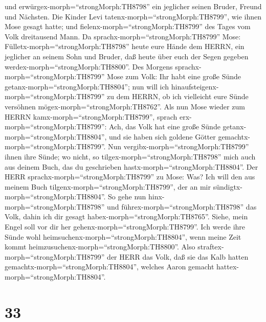 und erwürgex-morph=``strongMorph:TH8798'' ein jeglicher seinen Bruder,
Freund und Nächsten.  Die Kinder Levi
tatenx-morph=``strongMorph:TH8799'', wie ihnen Mose gesagt hatte; und
fielenx-morph=``strongMorph:TH8799'' des Tages vom Volk dreitausend
Mann.  Da sprachx-morph=``strongMorph:TH8799'' Mose:
Fülletx-morph=``strongMorph:TH8798'' heute eure Hände dem HERRN, ein
jeglicher an seinem Sohn und Bruder, daß heute über euch der Segen
gegeben werdex-morph=``strongMorph:TH8800''.  Des Morgens
sprachx-morph=``strongMorph:TH8799'' Mose zum Volk: Ihr habt eine große
Sünde getanx-morph=``strongMorph:TH8804''; nun will ich
hinaufsteigenx-morph=``strongMorph:TH8799'' zu dem HERRN, ob ich
vielleicht eure Sünde versöhnen mögex-morph=``strongMorph:TH8762''.
 Als nun Mose wieder zum HERRN
kamx-morph=``strongMorph:TH8799'', sprach
erx-morph=``strongMorph:TH8799'': Ach, das Volk hat eine große Sünde
getanx-morph=``strongMorph:TH8804'', und sie haben sich goldene Götter
gemachtx-morph=``strongMorph:TH8799''.  Nun
vergibx-morph=``strongMorph:TH8799'' ihnen ihre Sünde; wo nicht, so
tilgex-morph=``strongMorph:TH8798'' mich auch aus deinem Buch, das du
geschrieben hastx-morph=``strongMorph:TH8804''.  Der HERR
sprachx-morph=``strongMorph:TH8799'' zu Mose: Was? Ich will den aus
meinem Buch tilgenx-morph=``strongMorph:TH8799'', der an mir
sündigtx-morph=``strongMorph:TH8804''.  So gehe nun
hinx-morph=``strongMorph:TH8798'' und
führex-morph=``strongMorph:TH8798'' das Volk, dahin ich dir gesagt
habex-morph=``strongMorph:TH8765''. Siehe, mein Engel soll vor dir her
gehenx-morph=``strongMorph:TH8799''. Ich werde ihre Sünde wohl
heimsuchenx-morph=``strongMorph:TH8804'', wenn meine Zeit kommt
heimzusuchenx-morph=``strongMorph:TH8800''.  Also
straftex-morph=``strongMorph:TH8799'' der HERR das Volk, daß sie das
Kalb hatten gemachtx-morph=``strongMorph:TH8804'', welches Aaron gemacht
hattex-morph=``strongMorph:TH8804''.

\hypertarget{section-32}{%
\section{33}\label{section-32}}

